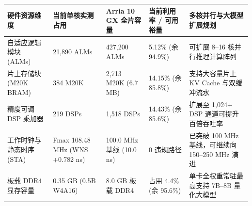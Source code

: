 \documentclass[11pt,a4paper]{article}
\begin{document}
{\footnotesize\renewcommand{\arraystretch}{1.14}\begin{longtable}{@{}L{0.19\textwidth}L{0.16\textwidth}L{0.16\textwidth}L{0.15\textwidth}L{0.24\textwidth}@{}}\toprule

\textbf{硬件资源维度} & \textbf{当前单核实测占用} & \textbf{Arria 10 GX 全片容量} & \textbf{当前利用率 /\allowbreak{} 可用裕量} & \textbf{多核并行与大模型扩展规划}\\\midrule\endhead

自适应逻辑模块 (\allowbreak{}ALMs)\allowbreak{} & 21,\allowbreak{}890 ALMs & 427,\allowbreak{}200 ALMs & 5.12\% (\allowbreak{}余 94.9\%)\allowbreak{} & 可扩展 8–16 核并行推理计算阵列\\[2pt]

片上存储块 (\allowbreak{}M20K BRAM)\allowbreak{} & 384 M20K & 2,\allowbreak{}713 M20K (\allowbreak{}6.7 MB)\allowbreak{} & 14.15\% (\allowbreak{}余 85.8\%)\allowbreak{} & 支持大容量片上 KV Cache 与双缓冲流水\\[2pt]

精度可调 DSP 乘加器 & 219 DSPs & 1,\allowbreak{}518 DSPs & 14.43\% (\allowbreak{}余 85.6\%)\allowbreak{} & 扩展至 1,\allowbreak{}024+\allowbreak{} DSP 通道可提升百倍吞吐率\\[2pt]

工作时钟与静态时序 (\allowbreak{}STA)\allowbreak{} & Fmax 108.48 MHz (\allowbreak{}WNS +\allowbreak{}0.782 ns)\allowbreak{} & 100.0 MHz 基线 (\allowbreak{}10.0 ns)\allowbreak{} & 0 违规路径 & 已突破 100 MHz 基线，可继续向 150–250 MHz 演进\\[2pt]

板载 DDR4 显存容量 & 0.35 GB (\allowbreak{}0.5B W4A16)\allowbreak{} & 8.0 GB 板载 DDR4 & 占用 4.4\% (\allowbreak{}余 95.6\%)\allowbreak{} & 单卡全权重常驻最高支持 7B–8B 量化大模型\\[2pt]

\bottomrule\end{longtable}}
\end{document}
